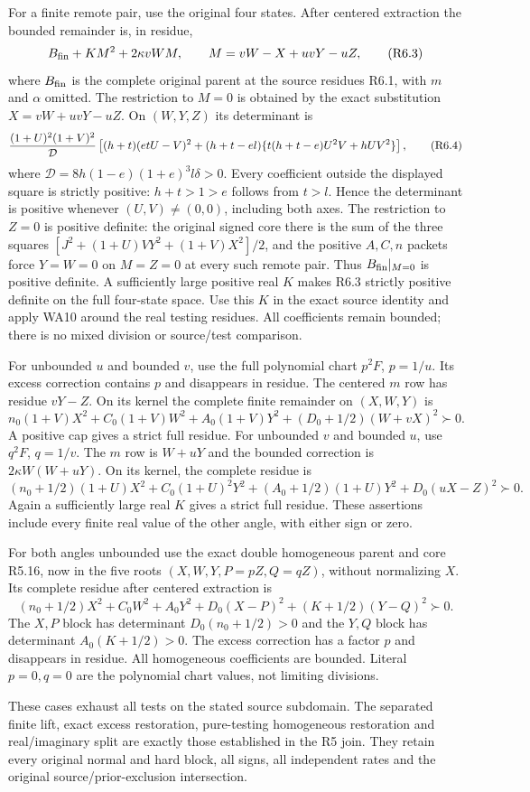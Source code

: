 For a finite remote pair, use the original four states. After centered
extraction the bounded remainder is, in residue,
\[
 B_{\rm fin}+K M^2+2\kappa vWM,\qquad
 M=vW-X+uvY-uZ,                                      \tag{R6.3}
\]
where $B_{\rm fin}$ is the complete original parent at the source
residues R6.1, with $m$ and $\alpha$ omitted. The restriction to
$M=0$ is obtained by the exact substitution $X=vW+uvY-uZ$.
On $(W,Y,Z)$ its determinant is
\[
 { (1+U)^2(1+V)^2\over\mathcal D}
 \left[(h+t)(etU-V)^2+(h+t-el)
          \{t(h+t-e)U^2V+hUV^2\}\right],             \tag{R6.4}
\]
where $\mathcal D=8h(1-e)(1+e)^3l\delta>0$.
Every coefficient outside the displayed square is strictly positive:
$h+t>1>e$ follows from $t>l$. Hence the determinant is positive
whenever $(U,V)\ne(0,0)$, including both axes. The restriction to
$Z=0$ is positive definite: the original signed core there is the sum
of the three squares
$[J^2+(1+U)VY^2+(1+V)X^2]/2$, and the positive $A,C,n$ packets
force $Y=W=0$ on $M=Z=0$ at every such remote pair.
Thus $B_{\rm fin}|_{M=0}$ is positive definite. A sufficiently large
positive real $K$ makes R6.3 strictly positive definite on the full
four-state space. Use this $K$ in the exact source identity and apply
WA10 around the real testing residues. All coefficients remain bounded;
there is no mixed division or source/test comparison.

For unbounded $u$ and bounded $v$, use the full polynomial chart
$p^2F$, $p=1/u$. Its excess correction contains $p$ and disappears in
residue. The centered $m$ row has residue $vY-Z$. On its kernel the
complete finite remainder on $(X,W,Y)$ is
\[
 n_0(1+V)X^2+C_0(1+V)W^2+A_0(1+V)Y^2
                                      +(D_0+1/2)(W+vX)^2\succ0.\tag{R6.5}
\]
A positive cap gives a strict full residue. For unbounded $v$ and bounded
$u$, use $q^2F$, $q=1/v$. The $m$ row is $W+uY$ and the bounded
correction is $2\kappa W(W+uY)$. On its kernel, the complete residue is
\[
 (n_0+1/2)(1+U)X^2+C_0(1+U)^2Y^2
             +(A_0+1/2)(1+U)Y^2+D_0(uX-Z)^2\succ0.  \tag{R6.6}
\]
Again a sufficiently large real $K$ gives a strict full residue.
These assertions include every finite real value of the other angle,
with either sign or zero.

For both angles unbounded use the exact double homogeneous parent and
core R5.16, now in the five roots $(X,W,Y,P=pZ,Q=qZ)$, without normalizing
$X$. Its complete residue after centered extraction is
\[
 (n_0+1/2)X^2+C_0W^2+A_0Y^2+D_0(X-P)^2
                                  +(K+1/2)(Y-Q)^2\succ0.        \tag{R6.7}
\]
The $X,P$ block has determinant $D_0(n_0+1/2)>0$ and the $Y,Q$ block
has determinant $A_0(K+1/2)>0$. The excess correction has a factor $p$
and disappears in residue. All homogeneous coefficients are bounded.
Literal $p=0,q=0$ are the polynomial chart values, not limiting divisions.

These cases exhaust all tests on the stated source subdomain. The
separated finite lift, exact excess restoration, pure-testing homogeneous
restoration and real/imaginary split are exactly those established in
the R5 join. They retain every original normal and hard block, all signs,
all independent rates and the original source/prior-exclusion intersection.
